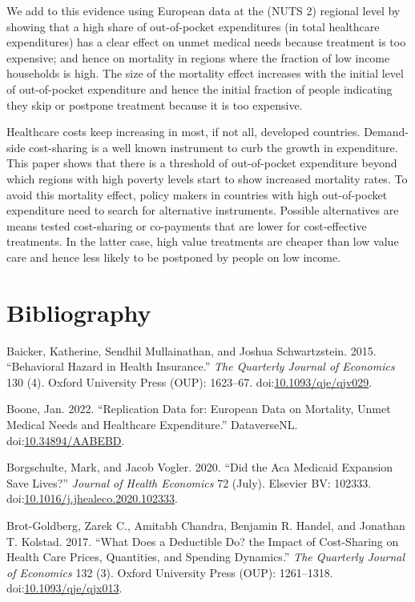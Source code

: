 \documentclass[a4paper,12pt]{article}
\begin{document}
We add to this evidence using European data at the (NUTS 2) regional level by showing that a high share of out-of-pocket expenditures (in total healthcare expenditures) has a clear effect on unmet medical needs because treatment is too expensive; and hence on mortality in regions where the fraction of low income households is high. The size of the mortality effect increases with the initial level of out-of-pocket expenditure and hence the initial fraction of people indicating they skip or postpone treatment because it is too expensive.

Healthcare costs keep increasing in most, if not all, developed countries. Demand-side cost-sharing is a well known instrument to curb the growth in expenditure. This paper shows that there is a threshold of out-of-pocket expenditure beyond which regions with high poverty levels start to show increased mortality rates. To avoid this mortality effect, policy makers in countries with high out-of-pocket expenditure need to search for alternative instruments. Possible alternatives are means tested cost-sharing or co-payments that are lower for cost-effective treatments. In the latter case, high value treatments are cheaper than low value care and hence less likely to be postponed by people on low income.


\section{Bibliography}
\label{sec:org8a9d73e}

\hypertarget{citeproc_bib_item_1}{Baicker, Katherine, Sendhil Mullainathan, and Joshua Schwartzstein. 2015. “Behavioral Hazard in Health Insurance.” \textit{The Quarterly Journal of Economics} 130 (4). Oxford University Press (OUP): 1623–67. doi:\href{https://doi.org/10.1093/qje/qjv029}{10.1093/qje/qjv029}.}

\hypertarget{citeproc_bib_item_2}{Boone, Jan. 2022. “Replication Data for: European Data on Mortality, Unmet Medical Needs and Healthcare Expenditure.” DataverseNL. doi:\href{https://doi.org/10.34894/AABEBD}{10.34894/AABEBD}.}

\hypertarget{citeproc_bib_item_3}{Borgschulte, Mark, and Jacob Vogler. 2020. “Did the Aca Medicaid Expansion Save Lives?” \textit{Journal of Health Economics} 72 (July). Elsevier BV: 102333. doi:\href{https://doi.org/10.1016/j.jhealeco.2020.102333}{10.1016/j.jhealeco.2020.102333}.}

\hypertarget{citeproc_bib_item_4}{Brot-Goldberg, Zarek C., Amitabh Chandra, Benjamin R. Handel, and Jonathan T. Kolstad. 2017. “What Does a Deductible Do? the Impact of Cost-Sharing on Health Care Prices, Quantities, and Spending Dynamics.” \textit{The Quarterly Journal of Economics} 132 (3). Oxford University Press (OUP): 1261–1318. doi:\href{https://doi.org/10.1093/qje/qjx013}{10.1093/qje/qjx013}.}
\end{document}
